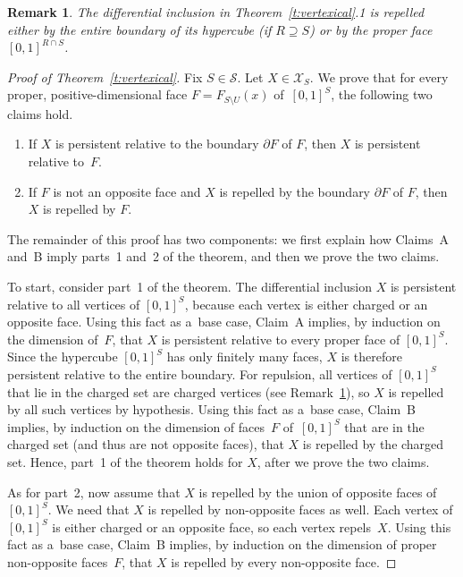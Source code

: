 \documentclass[pdftex]{sigma}
\newtheorem{Remark}[Theorem]{Remark}
\begin{document}
\begin{Remark}
\label{r:chargedSet}
The dif\/ferential inclusion in Theorem~\ref{t:vertexical}.1 is repelled either by the entire boundary of its hypercube
(if $R\supseteq S$) or by the proper face $[0,1]^{R\cap S}$.
\end{Remark}
\begin{proof}[Proof of Theorem~\ref{t:vertexical}] Fix $S\in\mathcal S$.
Let $X\in\mathcal X_S$.
We prove that for every proper, positive-dimensional face $F=F_{S\setminus U}(x)$ of~$[0,1]^S$, the following two
claims hold.
\begin{enumerate}\itemsep=-0.5pt
 \item[A.] If $X$ is persistent relative to the boundary $\partial F$ of $F$, then $X$ is persistent relative to~$F$.
\item[B.]  If $F$ is not an opposite face and $X$ is repelled by the boundary $\partial F$ of $F$, then $X$ is repelled by
$F$.
\end{enumerate}
The remainder of this proof has two components: we f\/irst explain how Claims~A and~B imply parts~1 and~2 of the
theorem, and then we prove the two claims.

To start, consider part~1 of the theorem.
The dif\/ferential inclusion $X$ is persistent relative to all vertices of $[0,1]^S$, because each vertex is either
charged or an opposite face.
Using this fact as a~base case, Claim~A implies, by induction on the dimension of~$F$, that $X$ is persistent relative
to every proper face of $[0,1]^S$.
Since the hypercube $[0,1]^S$ has only f\/initely many faces, $X$ is therefore persistent relative to the entire
boundary.
For repulsion, all vertices of $[0,1]^S$ that lie in the charged set are charged vertices (see
Remark~\ref{r:chargedSet}), so $X$ is repelled by all such vertices by hypothesis.
Using this fact as a~base case, Claim~B implies, by induction on the dimension of faces~$F$ of~$[0,1]^S$ that are in
the charged set (and thus are not opposite faces), that $X$ is repelled by the charged set.
Hence, part~1 of the theorem holds for $X$, after we prove the two claims.

As for part~2, now assume that $X$ is repelled by the union of opposite faces of\/~$[0,1]^S$.
We need that $X$ is repelled by non-opposite faces as well.
Each vertex of $[0,1]^S$ is either charged or an opposite face, so each vertex repels~$X$.
Using this fact as a~base case, Claim~B implies, by induction on the dimension of proper non-opposite faces~$F$, that
$X$ is repelled by every non-opposite face.


\end{proof}
\end{document}
